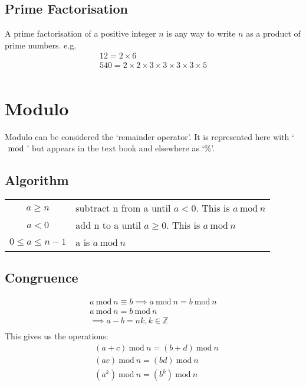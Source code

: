 \documentclass[12pt] {article}
\newcommand{\Mod}[1]{\ \mathrm{mod}\ #1}
\begin{document}
\subsection*{Prime Factorisation}
A prime factorisation of a positive integer $n$ is any way to write $n$ as a product of prime numbers. e.g.
\begin{gather*}
  12 = 2 \times 6 \\
  540 = 2 \times 2 \times 3 \times 3 \times 3 \times 3 \times 5 \\
\end{gather*}

\newpage
\section*{Modulo}
Modulo can be considered the `remainder operator'. It is represented here with `$\Mod$'
but appears in the text book and elsewhere as `$\%$'.

\subsection*{Algorithm}
\begin{tabular}{c|l}
  $a \geq n$ & subtract n from a until $a < 0$. This is $a \Mod n$ \\
  $a < 0$ & add n to a until $a \geq 0$. This is $a \Mod n$ \\
  $0 \leq a \leq n-1$ & a is $a \Mod n$ \\
\end{tabular}

\subsection*{Congruence}
\begin{gather*}
  a \Mod n \equiv b \implies a \Mod n = b \Mod n \\
  a \Mod n = b \Mod n \\
  \implies a-b = nk, k \in \mathbb{Z} \\
\end{gather*}
This gives us the operations:
\begin{align*}
  &(a+c) \Mod n = (b+d) \Mod n \\
  &(ac) \Mod n = (bd) \Mod n \\
  &(a^k) \Mod n = (b^k) \Mod n 
\end{align*}
\end{document}
